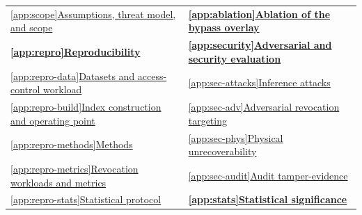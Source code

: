 \documentclass[sigconf, nonacm, review]{acmart}
\begin{document}
\begin{strip}
\begin{tabular}{@{}p{}p{}@{}}
\hspace*{1.2em}\hyperref[app:scope]{\ref*{app:scope}\hspace{0.5em}Assumptions, threat model, and scope} & \hyperref[app:ablation]{\textbf{\ref*{app:ablation}}\hspace{0.5em}\textbf{Ablation of the bypass overlay}} \\
\hyperref[app:repro]{\textbf{\ref*{app:repro}}\hspace{0.5em}\textbf{Reproducibility}} & \hyperref[app:security]{\textbf{\ref*{app:security}}\hspace{0.5em}\textbf{Adversarial and security evaluation}} \\
\hspace*{1.2em}\hyperref[app:repro-data]{\ref*{app:repro-data}\hspace{0.5em}Datasets and access-control workload} & \hspace*{1.2em}\hyperref[app:sec-attacks]{\ref*{app:sec-attacks}\hspace{0.5em}Inference attacks} \\
\hspace*{1.2em}\hyperref[app:repro-build]{\ref*{app:repro-build}\hspace{0.5em}Index construction and operating point} & \hspace*{1.2em}\hyperref[app:sec-adv]{\ref*{app:sec-adv}\hspace{0.5em}Adversarial revocation targeting} \\
\hspace*{1.2em}\hyperref[app:repro-methods]{\ref*{app:repro-methods}\hspace{0.5em}Methods} & \hspace*{1.2em}\hyperref[app:sec-phys]{\ref*{app:sec-phys}\hspace{0.5em}Physical unrecoverability} \\
\hspace*{1.2em}\hyperref[app:repro-metrics]{\ref*{app:repro-metrics}\hspace{0.5em}Revocation workloads and metrics} & \hspace*{1.2em}\hyperref[app:sec-audit]{\ref*{app:sec-audit}\hspace{0.5em}Audit tamper-evidence} \\
\hspace*{1.2em}\hyperref[app:repro-stats]{\ref*{app:repro-stats}\hspace{0.5em}Statistical protocol} & \hyperref[app:stats]{\textbf{\ref*{app:stats}}\hspace{0.5em}\textbf{Statistical significance}} \\

\end{tabular}
\end{strip}
\end{document}
